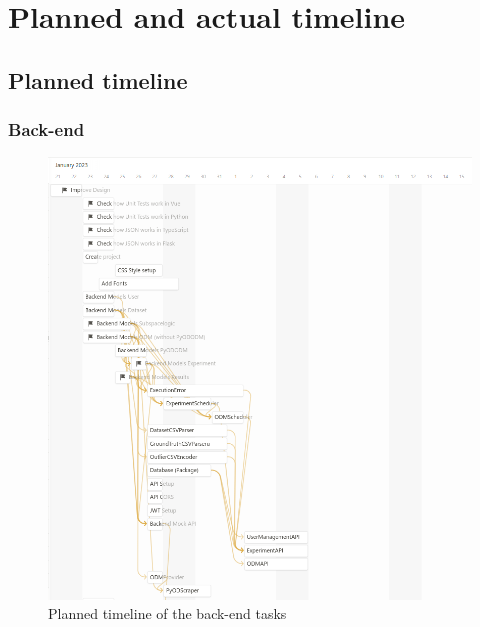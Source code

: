 \section{Planned and actual timeline}\label{sec:timeline}

\subsection{Planned timeline}
\subsubsection*{Back-end}
\begin{figure}[!ht]
    \centering
    \includegraphics[width=\textwidth]{images/timeline-planned-backend.png}
    \caption{Planned timeline of the back-end tasks}
    \label{fig:timeline-planned-backend}
\end{figure}
\clearpage

